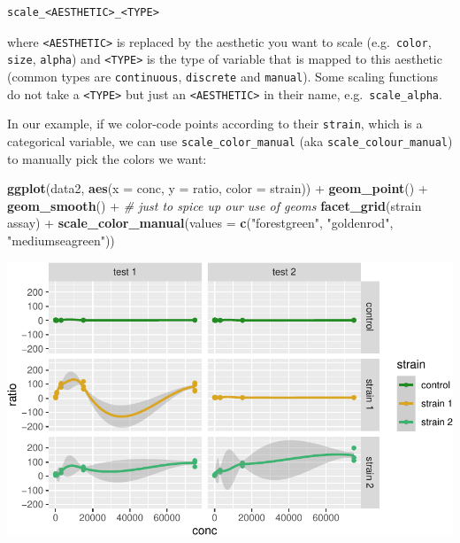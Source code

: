 \documentclass[]{book}
\newenvironment{Shaded}{}{}
\newcommand{\CommentTok}[1]{\textcolor[rgb]{0.38,0.63,0.69}{\textit{#1}}}
\newcommand{\DataTypeTok}[1]{\textcolor[rgb]{0.56,0.13,0.00}{#1}}
\newcommand{\KeywordTok}[1]{\textcolor[rgb]{0.00,0.44,0.13}{\textbf{#1}}}
\newcommand{\NormalTok}[1]{#1}
\newcommand{\OperatorTok}[1]{\textcolor[rgb]{0.40,0.40,0.40}{#1}}
\newcommand{\StringTok}[1]{\textcolor[rgb]{0.25,0.44,0.63}{#1}}
\begin{document}
\begin{verbatim}
scale_<AESTHETIC>_<TYPE>
\end{verbatim}

where \texttt{\textless{}AESTHETIC\textgreater{}} is replaced by the aesthetic you want to scale (e.g.~\texttt{color}, \texttt{size}, \texttt{alpha}) and \texttt{\textless{}TYPE\textgreater{}} is the type of variable that is mapped to this aesthetic (common types are \texttt{continuous}, \texttt{discrete} and \texttt{manual}). Some scaling functions do not take a \texttt{\textless{}TYPE\textgreater{}} but just an \texttt{\textless{}AESTHETIC\textgreater{}} in their name, e.g.~\texttt{scale\_alpha}.

In our example, if we color-code points according to their \texttt{strain}, which is a categorical variable, we can use \texttt{scale\_color\_manual} (aka \texttt{scale\_colour\_manual}) to manually pick the colors we want:

\begin{Shaded}
\begin{Highlighting}[]
\KeywordTok{ggplot}\NormalTok{(data2, }\KeywordTok{aes}\NormalTok{(}\DataTypeTok{x =}\NormalTok{ conc, }\DataTypeTok{y =}\NormalTok{ ratio, }\DataTypeTok{color =}\NormalTok{ strain)) }\OperatorTok{+}
\StringTok{  }\KeywordTok{geom_point}\NormalTok{() }\OperatorTok{+}
\StringTok{  }\KeywordTok{geom_smooth}\NormalTok{() }\OperatorTok{+}\StringTok{ }\CommentTok{# just to spice up our use of geoms}
\StringTok{  }\KeywordTok{facet_grid}\NormalTok{(strain }\OperatorTok{~}\StringTok{ }\NormalTok{assay) }\OperatorTok{+}
\StringTok{  }\KeywordTok{scale_color_manual}\NormalTok{(}\DataTypeTok{values =} \KeywordTok{c}\NormalTok{(}\StringTok{"forestgreen"}\NormalTok{, }\StringTok{"goldenrod"}\NormalTok{, }\StringTok{"mediumseagreen"}\NormalTok{))}
\end{Highlighting}
\end{Shaded}

\begin{center}\includegraphics[width=\textwidth]{TRES-Tidy-Tutorial_files/figure-latex/unnamed-chunk-139-1} \end{center}
\end{document}
